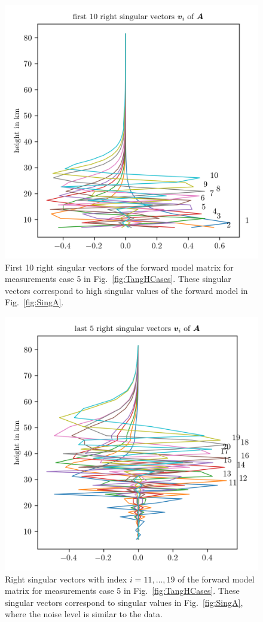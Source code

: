 \begin{figure}[ht!]
	\centering
	\includegraphics{SingVecA.png}
	\caption[First 10 right singular vectors of forward model.]{First 10 right singular vectors of the forward model matrix for measurements case 5 in Fig.~\ref{fig:TangHCases}. These singular vectors correspond to high singular values of the forward model in Fig.~\ref{fig:SingA}.}
	\label{fig:SingVecA}
\end{figure}
\begin{figure}[ht!]
	\centering
	\includegraphics{MiddleVecA.png}
	\caption[Right singular vectors 11 to 19 of forward model.]{Right singular vectors with index $i = 11,\dots, 19$ of the forward model matrix for measurements case 5 in Fig.~\ref{fig:TangHCases}.
		These singular vectors correspond to singular values in Fig.~\ref{fig:SingA}, where the noise level is similar to the data.}
	\label{fig:middleSpace}
\end{figure}
